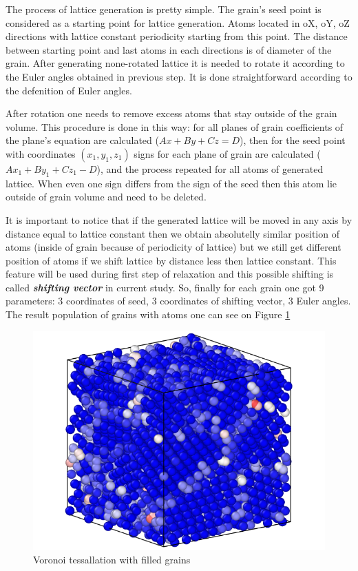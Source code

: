 \documentclass[12pt]{report}
\begin{document}
The process of lattice generation is pretty simple. The grain's seed point is considered as a starting point for lattice generation. Atoms located in oX, oY, oZ directions with lattice constant periodicity starting from this point. The distance between starting point and last atoms in each directions is of diameter of the grain. After generating none-rotated lattice it is needed to rotate it according to the Euler angles obtained in previous step. It is done straightforward according to the defenition of Euler angles. 

After rotation one needs to remove excess atoms that stay outside of the grain volume. This procedure is done in this way: for all planes of grain coefficients of the plane's equation are calculated ($Ax + By + Cz = D$), then for the seed point with coordinates $(x_1, y_1, z_1)$ signs for each plane of grain are calculated ($Ax_1 + By_1 + Cz_1 - D$), and the process repeated for all atoms of generated lattice. When even one sign differs from the sign of the seed then this atom lie outside of grain volume and need to be deleted.

It is important to notice that if the generated lattice will be moved in any axis by distance equal to lattice constant then we obtain absolutelly similar position of atoms (inside of grain because of periodicity of lattice) but we still get different position of atoms if we shift lattice by distance less then lattice constant. This feature will be used during first step of relaxation and this possible shifting is called \textit{\textbf{shifting vector}} in current study. So, finally for each grain one got 9 parameters: 3 coordinates of seed, 3 coordinates of shifting vector, 3 Euler angles. The result population of grains with atoms one can see on Figure \ref{cubefilled}

\begin{figure}
    \centering
    \includegraphics[width=5.0in]{cube_filled}
    \caption{Voronoi tessallation with filled grains}
    \label{cubefilled}
\end{figure}
\end{document}

